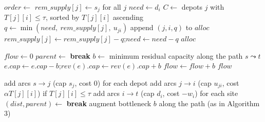 \documentclass[11pt]{article}
\begin{document}
\begin{algorithm}[H]
\caption{Greedy allocation (A1)}
\begin{algorithmic}[1]
  \State $order \gets$  
  \State $rem\_supply[j] \gets s_j$ for all $j$
    \State $need \gets d_i$
    \State $C \gets$ depots $j$ with $T[j][i] \le \tau$, sorted by $T[j][i]$ ascending
      \State $q \gets \min(need,\ rem\_supply[j],\ u_{ji})$
        \State append $(j, i, q)$ to $alloc$
        \State $rem\_supply[j] \gets rem\_supply[j] - q$;\quad $need \gets need - q$
      \EndIf
    \EndFor
  \EndFor
  \State \Return $alloc$
\EndFunction
\end{algorithmic}
\end{algorithm}

\begin{algorithm}[H]
\caption{Edmonds--Karp maximum flow (A2; also the feasibility check inside A5)}
\begin{algorithmic}[1]
  \State $flow \gets 0$
  \Loop
    \State $parent \gets$  
     \State \textbf{break} \EndIf
    \State $b \gets$ minimum residual capacity along the path $s \leadsto t$
      \State $e.cap \gets e.cap - b$;\quad $rev(e).cap \gets rev(e).cap + b$
    \EndFor
    \State $flow \gets flow + b$
  \EndLoop
  \State \Return $flow$
\EndFunction
\end{algorithmic}
\end{algorithm}

\begin{algorithm}[H]
\caption{Urgency-weighted min-cost flow (A4)}
\begin{algorithmic}[1]
  \State add arcs $s \to j$ (cap $s_j$, cost $0$) for each depot
  \State add arcs $j \to i$ (cap $u_{ji}$, cost $\alpha T[j][i]$) if $T[j][i] \le \tau$
  \State add arcs $i \to t$ (cap $d_i$, cost $-w_i$) for each site
  \Loop
    \State $(dist, parent) \gets$ 
     \State \textbf{break}  \EndIf
    \State augment bottleneck $b$ along the path (as in Algorithm 3)
  \EndLoop
  \State \Return {}
\EndFunction
\end{algorithmic}
\end{algorithm}
\end{document}
